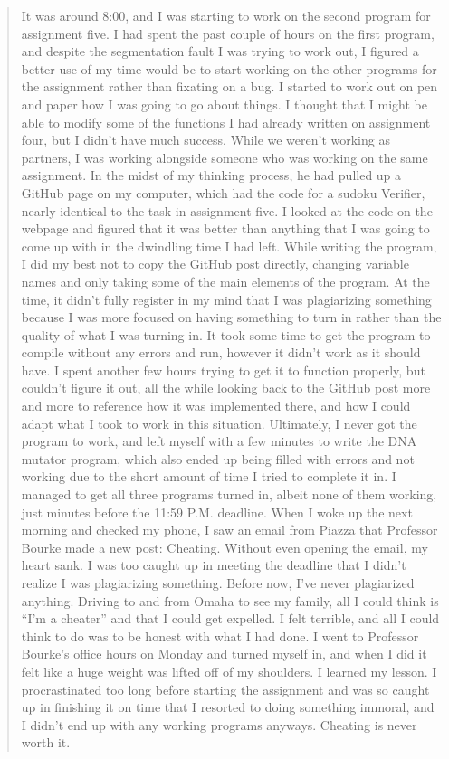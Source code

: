 \documentclass[12pt]{scrartcl}
\begin{document}
\begin{quote}
It was around 8:00, and I was starting to work on the second program for assignment five. I had spent the past couple of hours on the first program, and despite the segmentation fault I was trying to work out, I figured a better use of my time would be to start working on the other programs for the assignment rather than fixating on a bug. I started to work out on pen and paper how I was going to go about things. I thought that I might be able to modify some of the functions I had already written on assignment four, but I didn't have much success. While we weren't working as partners, I was working alongside someone who was working on the same assignment. In the midst of my thinking process, he had pulled up a GitHub page on my computer, which had the code for a sudoku Verifier, nearly identical to the task in assignment five. I looked at the code on the webpage and figured that it was better than anything that I was going to come up with in the dwindling time I had left.
	While writing the program, I did my best not to copy the GitHub post directly, changing variable names and only taking some of the main elements of the program. At the time, it didn't fully register in my mind that I was plagiarizing something because I was more focused on having something to turn in rather than the quality of what I was turning in. It took some time to get the program to compile without any errors and run, however it didn't work as it should have. I spent another few hours trying to get it to function properly, but couldn't figure it out, all the while looking back to the GitHub post more and more to reference how it was implemented there, and how I could adapt what I took to work in this situation. Ultimately, I never got the program to work, and left myself with a few minutes to write the DNA mutator program, which also ended up being filled with errors and not working due to the short amount of time I tried to complete it in. I managed to get all three programs turned in, albeit none of them working, just minutes before the 11:59 P.M. deadline. 
	When I woke up the next morning and checked my phone, I saw an email from Piazza that Professor Bourke made a new post: Cheating. Without even opening the email, my heart sank. I was too caught up in meeting the deadline that I didn't realize I was plagiarizing something. Before now, I've never plagiarized anything. Driving to and from Omaha to see my family, all I could think is ``I'm a cheater'' and that I could get expelled. I felt terrible, and all I could think to do was to be honest with what I had done. I went to Professor Bourke's office hours on Monday and turned myself in, and when I did it felt like a huge weight was lifted off of my shoulders. 
	I learned my lesson. I procrastinated too long before starting the assignment and was so caught up in finishing it on time that I resorted to doing something immoral, and I didn't end up with any working programs anyways. Cheating is never worth it.
\end{quote}
\end{document}
